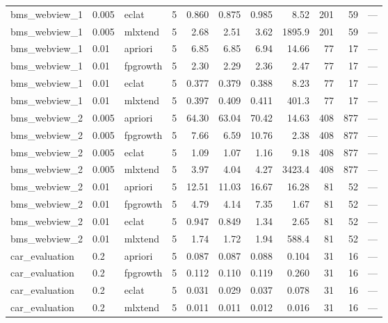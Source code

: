\documentclass[journal,a4paper]{IEEEtran}
\begin{document}
\begin{longtable}{p{3.0cm}llrrrrrrrp{2.4cm}}
bms\_\allowbreak{}webview\_\allowbreak{}1 & 0.005 & eclat & 5 & 0.860 & 0.875 & 0.985 & 8.52 & 201 & 59 & --- \\
bms\_\allowbreak{}webview\_\allowbreak{}1 & 0.005 & mlxtend & 5 & 2.68 & 2.51 & 3.62 & 1895.9 & 201 & 59 & --- \\
bms\_\allowbreak{}webview\_\allowbreak{}1 & 0.01 & apriori & 5 & 6.85 & 6.85 & 6.94 & 14.66 & 77 & 17 & --- \\
bms\_\allowbreak{}webview\_\allowbreak{}1 & 0.01 & fpgrowth & 5 & 2.30 & 2.29 & 2.36 & 2.47 & 77 & 17 & --- \\
bms\_\allowbreak{}webview\_\allowbreak{}1 & 0.01 & eclat & 5 & 0.377 & 0.379 & 0.388 & 8.23 & 77 & 17 & --- \\
bms\_\allowbreak{}webview\_\allowbreak{}1 & 0.01 & mlxtend & 5 & 0.397 & 0.409 & 0.411 & 401.3 & 77 & 17 & --- \\
bms\_\allowbreak{}webview\_\allowbreak{}2 & 0.005 & apriori & 5 & 64.30 & 63.04 & 70.42 & 14.63 & 408 & 877 & --- \\
bms\_\allowbreak{}webview\_\allowbreak{}2 & 0.005 & fpgrowth & 5 & 7.66 & 6.59 & 10.76 & 2.38 & 408 & 877 & --- \\
bms\_\allowbreak{}webview\_\allowbreak{}2 & 0.005 & eclat & 5 & 1.09 & 1.07 & 1.16 & 9.18 & 408 & 877 & --- \\
bms\_\allowbreak{}webview\_\allowbreak{}2 & 0.005 & mlxtend & 5 & 3.97 & 4.04 & 4.27 & 3423.4 & 408 & 877 & --- \\
bms\_\allowbreak{}webview\_\allowbreak{}2 & 0.01 & apriori & 5 & 12.51 & 11.03 & 16.67 & 16.28 & 81 & 52 & --- \\
bms\_\allowbreak{}webview\_\allowbreak{}2 & 0.01 & fpgrowth & 5 & 4.79 & 4.14 & 7.35 & 1.67 & 81 & 52 & --- \\
bms\_\allowbreak{}webview\_\allowbreak{}2 & 0.01 & eclat & 5 & 0.947 & 0.849 & 1.34 & 2.65 & 81 & 52 & --- \\
bms\_\allowbreak{}webview\_\allowbreak{}2 & 0.01 & mlxtend & 5 & 1.74 & 1.72 & 1.94 & 588.4 & 81 & 52 & --- \\
car\_\allowbreak{}evaluation & 0.2 & apriori & 5 & 0.087 & 0.087 & 0.088 & 0.104 & 31 & 16 & --- \\
car\_\allowbreak{}evaluation & 0.2 & fpgrowth & 5 & 0.112 & 0.110 & 0.119 & 0.260 & 31 & 16 & --- \\
car\_\allowbreak{}evaluation & 0.2 & eclat & 5 & 0.031 & 0.029 & 0.037 & 0.078 & 31 & 16 & --- \\
car\_\allowbreak{}evaluation & 0.2 & mlxtend & 5 & 0.011 & 0.011 & 0.012 & 0.016 & 31 & 16 & --- \\

\end{longtable}
\end{document}

